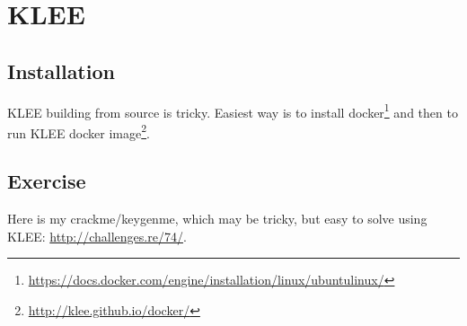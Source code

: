 \section{KLEE}

\subsection{Installation}

KLEE building from source is tricky.
Easiest way is to install docker\footnote{\url{https://docs.docker.com/engine/installation/linux/ubuntulinux/}} and then to run KLEE docker image\footnote{\url{http://klee.github.io/docker/}}.














\subsection{Exercise}

Here is my crackme/keygenme, which may be tricky, but easy to solve using KLEE:
\url{http://challenges.re/74/}.


